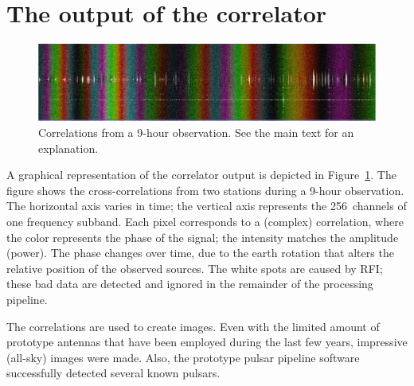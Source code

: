 \documentclass[10pt]{article}
\begin{document}
%
\section{The output of the correlator}

\begin{figure}
\begin{center}
\includegraphics[width=12cm]{fringe.jpg}
\end{center}
\caption{Correlations from a 9-hour observation.  See the main text for
an explanation.}
\label{fig:fringe}
\end{figure}

A graphical representation of the correlator output is depicted in
Figure~\ref{fig:fringe}.
The figure shows the cross-correlations from two stations during a 9-hour
observation.
The horizontal axis varies in time;
the vertical axis represents the 256~channels of one frequency subband.
Each pixel corresponds to a (complex) correlation, where the color represents
the phase of the signal; the intensity matches the amplitude (power).
The phase changes over time, due to the earth rotation that alters the
relative position of the observed sources.
The white spots are caused by RFI; these bad data are detected and
ignored in the remainder of the processing pipeline.

The correlations are used to create images.
Even with the limited amount of prototype antennas that have been employed
during the last few years, impressive (all-sky) images were made.
Also, the prototype pulsar pipeline software successfully detected several
known pulsars.
\end{document}
